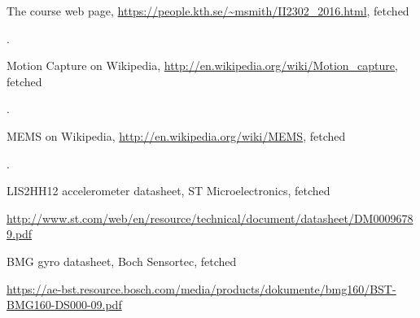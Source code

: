 \documentclass[a4paper, 12pt]{article}
\begin{document}
\begin{thebibliography}{7}

	The course web page,
	\url{https://people.kth.se/~msmith/II2302\_2016.html}, fetched \date{\today{}}.

	Motion Capture on Wikipedia,
	\url{http://en.wikipedia.org/wiki/Motion\_capture}, fetched \date{\today{}}.

	MEMS on Wikipedia,
	\url{http://en.wikipedia.org/wiki/MEMS}, fetched \date{\today{}}.


        LIS2HH12 accelerometer datasheet, ST Microelectronics, fetched \date{\today{}}
        \url{http://www.st.com/web/en/resource/technical/document/datasheet/DM00096789.pdf}
	
        BMG gyro datasheet, Boch Sensortec, fetched \date{\today{}}
        \url{https://ae-bst.resource.bosch.com/media/products/dokumente/bmg160/BST-BMG160-DS000-09.pdf}
	

\end{thebibliography}
\end{document}
